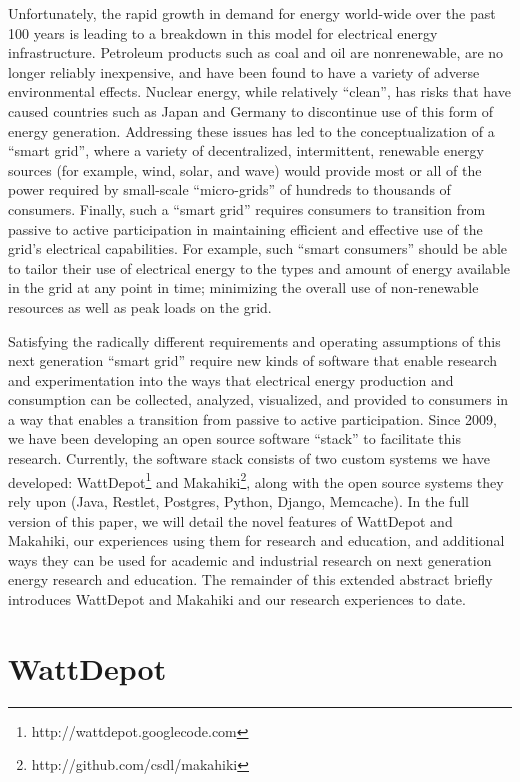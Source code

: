 \documentclass{acm_proc_article-sp}
\begin{document}
Unfortunately, the rapid growth in demand for energy world-wide over the past 100 years is
leading to a breakdown in this model for electrical energy infrastructure.  Petroleum
products such as coal and oil are nonrenewable, are no longer reliably inexpensive, and
have been found to have a variety of adverse environmental effects.  Nuclear energy, while
relatively ``clean'', has risks that have caused countries such as Japan and Germany to
discontinue use of this form of energy generation.  Addressing these issues has led
to the conceptualization of a ``smart grid'', where a variety of decentralized,
intermittent, renewable energy sources (for example, wind, solar, and wave) would provide
most or all of the power required by small-scale ``micro-grids'' of hundreds to thousands
of consumers. Finally, such a ``smart grid'' requires consumers to transition from passive
to active participation in maintaining efficient and effective use of the grid's
electrical capabilities.  For example, such ``smart consumers'' should be able to tailor
their use of electrical energy to the types and amount of energy available in the grid at
any point in time; minimizing the overall use of non-renewable resources as well as peak
loads on the grid.

Satisfying the radically different requirements and operating assumptions of this next
generation ``smart grid'' require new kinds of software that enable research and
experimentation into the ways that electrical energy production and consumption can be
collected, analyzed, visualized, and provided to consumers in a way that enables a
transition from passive to active participation.  Since 2009, we have been developing an
open source software ``stack'' to facilitate this research.  Currently, the software stack
consists of two custom systems we have developed:
WattDepot\footnote{http://wattdepot.googlecode.com} and
Makahiki\footnote{http://github.com/csdl/makahiki}, along with the open source systems
they rely upon (Java, Restlet, Postgres, Python, Django, Memcache).  In the full version
of this paper, we will detail the novel features of WattDepot and Makahiki, our
experiences using them for research and education, and additional ways they can be used
for academic and industrial research on next generation energy research and education.
The remainder of this extended abstract briefly introduces WattDepot and Makahiki and our
research experiences to date.

\section{WattDepot}
\end{document}
